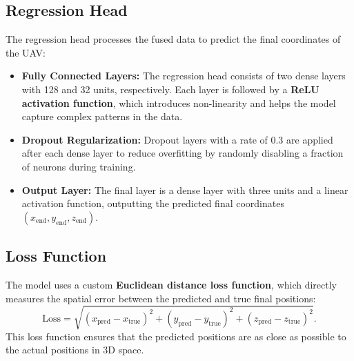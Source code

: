 \subsection{Regression Head}
The regression head processes the fused data to predict the final coordinates of the UAV:
\begin{itemize}
    \item \textbf{Fully Connected Layers:} The regression head consists of two dense layers with 128 and 32 units, respectively. Each layer is followed by a \textbf{ReLU activation function}, which introduces non-linearity and helps the model capture complex patterns in the data.
    \item \textbf{Dropout Regularization:} Dropout layers with a rate of 0.3 are applied after each dense layer to reduce overfitting by randomly disabling a fraction of neurons during training.
    \item \textbf{Output Layer:} The final layer is a dense layer with three units and a linear activation function, outputting the predicted final coordinates \((x_{\text{end}}, y_{\text{end}}, z_{\text{end}})\).
\end{itemize}

\subsection{ Loss Function}
The model uses a custom \textbf{Euclidean distance loss function}, which directly measures the spatial error between the predicted and true final positions:
\[
\text{Loss} = \sqrt{(x_{\text{pred}} - x_{\text{true}})^2 + (y_{\text{pred}} - y_{\text{true}})^2 + (z_{\text{pred}} - z_{\text{true}})^2}.
\]
This loss function ensures that the predicted positions are as close as possible to the actual positions in 3D space.

